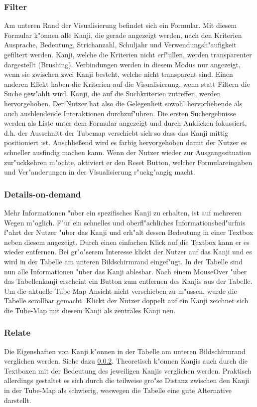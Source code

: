 \subsubsection{Filter}\label{Filter}
Am unteren Rand der Visualisierung befindet sich ein Formular. Mit diesem Formular k"onnen alle Kanji, die gerade angezeigt werden, nach den Kriterien Ausprache, Bedeutung, Strichanzahl, Schuljahr und Verwendungsh"aufigkeit gefiltert werden. Kanji, welche die Kriterien nicht erf"ullen, werden transparenter dargestellt (Brushing). Verbindungen werden in diesem Modus nur angezeigt, wenn sie zwischen zwei Kanji besteht, welche nicht transparent sind. Einen anderen Effekt haben die Kriterien auf die Visualisierung, wenn statt Filtern die Suche gew"ahlt wird. Kanji, die auf die Suchkriterien zutreffen, werden hervorgehoben. Der Nutzer hat also die Gelegenheit sowohl hervorhebende als auch ausblendende Interaktionen durchzuf"uhren. Die ersten Suchergebnisse werden als Liste unter dem Formular angezeigt und durch Anklicken fokussiert, d.h. der Ausschnitt der Tubemap verschiebt sich so dass das Kanji mittig positioniert ist. Anschließend  wird es farbig hervorgehoben damit der Nutzer es schneller ausfindig machen kann. Wenn der Nutzer wieder zur Ausgangssituation zur"uckkehren m"ochte, aktiviert er den Reset Button, welcher Formulareingaben und Ver"anderungen in der Visualisierung r"uckg"angig macht.

\subsubsection{Details-on-demand}\label{Details-on-demand}
Mehr Informationen "uber ein spezifisches Kanji zu erhalten, ist auf mehreren Wegen m"oglich. F"ur ein schnelles und oberfl"achliches Informationsbed"urfnis f"ahrt der Nutzer "uber das Kanji und erh"alt dessen Bedeutung in einer Textbox neben diesem angezeigt. Durch einen einfachen Klick auf die Textbox kann er es wieder entfernen. Bei gr"o"serem Interesse klickt der Nutzer auf das Kanji und es wird in der Tabelle am unteren Bildschirmrand eingef"ugt. In der Tabelle sind nun alle Informationen "uber das Kanji ablesbar. Nach einem MouseOver "uber das Tabellenkanji erscheint ein Button zum entfernen des Kanjis aus der Tabelle. Um die aktuelle Tube-Map Ansicht nicht verschieben zu m"ussen, wurde die Tabelle scrollbar gemacht. Klickt der Nutzer doppelt auf ein Kanji zeichnet sich die Tube-Map mit diesem Kanji als zentrales Kanji neu. 

\subsubsection{Relate}
Die Eigenshaften von Kanji k"onnen in der Tabelle am unteren Bildschirmrand verglichen werden. Siehe dazu \ref{Details-on-demand}. Theoretisch k"onnen Kanjis auch durch die Textboxen mit der Bedeutung des jeweiligen Kanjis verglichen werden. Praktisch allerdings gestaltet es sich durch die teilweise gro"se Distanz zwischen den Kanji in der Tube-Map als schwierig, weswegen die Tabelle eine gute Alternative darstellt. 


